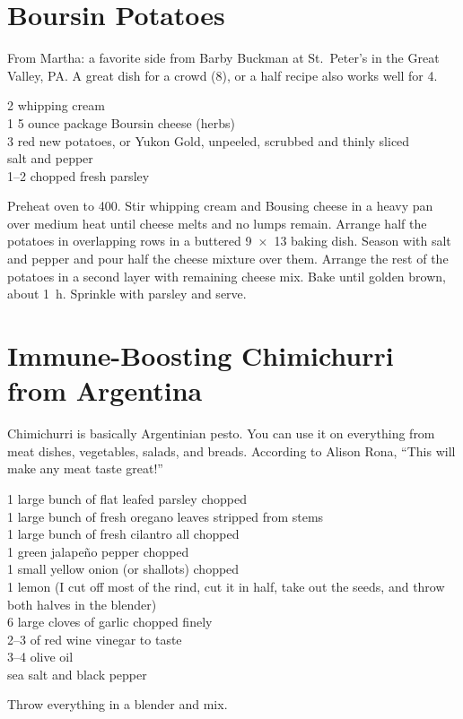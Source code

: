\section{Boursin Potatoes}

\begin{open}
    From Martha: a favorite side from Barby Buckman at St.~Peter's in the Great
    Valley, PA. A great dish for a crowd (8), or a half recipe also works well
    for 4.
\end{open}
\begin{ingredients}
    \SI{2}{\cup} whipping cream\\
    1 \SI{5}{\ounce} ounce package Boursin cheese (herbs)\\
    \SI{3}{\pound} red new potatoes, or Yukon Gold, unpeeled, scrubbed and
    thinly sliced\\
    salt and pepper\\
    \SIrange{1}{2}{\tblspoon} chopped fresh parsley
\end{ingredients}
Preheat oven to \SI{400}{\degreeF}. Stir whipping cream and Bousing cheese in a
heavy pan over medium heat until cheese melts and no lumps remain. Arrange half
the potatoes in overlapping rows in a buttered \SI{9x13}{\inch} baking dish.
Season with salt and pepper and pour half the cheese mixture over them. Arrange
the rest of the potatoes in a second layer with remaining cheese mix. Bake until
golden brown, about \SI{1}{\hour}. Sprinkle with parsley and serve.

\section{Immune-Boosting Chimichurri from Argentina}

\begin{open}
    Chimichurri is basically Argentinian pesto.  You can use it on everything
    from meat dishes, vegetables, salads, and breads.  According to Alison Rona,
    ``This will make any meat taste great!''
\end{open}
\begin{ingredients}
    1 large bunch of flat leafed parsley chopped\\
    1 large bunch of fresh oregano leaves stripped from stems\\
    1 large bunch of fresh cilantro all chopped\\
    1 green jalape\~{n}o pepper chopped\\
    1 small yellow onion (or shallots) chopped\\
    1 lemon (I cut off most of the rind, cut it in half, take out the seeds, and
    throw both halves in the blender)\\
    6 large cloves of garlic chopped finely\\
    \SIrange{2}{3}{\tblspoon} of red wine vinegar to taste\\
    \SIrange{3}{4}{\tblspoon} olive oil\\
    sea salt and black pepper
\end{ingredients}
Throw everything in a blender and mix.
